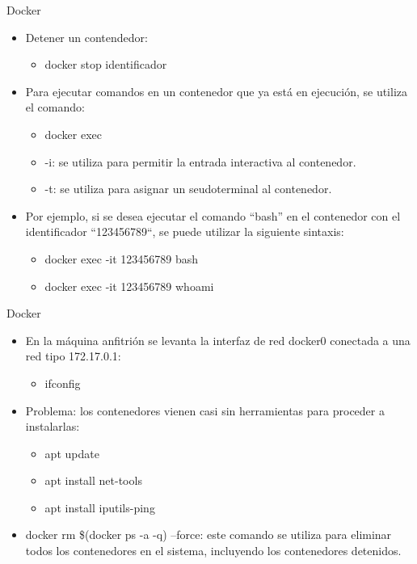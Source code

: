 \documentclass[aspectratio=169,11pt]{beamer}
\begin{document}
\begin{frame}[allowframebreaks]{Docker}
\small
  \begin{itemize}
  \item Detener un contendedor:
  \begin{itemize}
  \item docker stop identificador
  \end{itemize}
  \item Para ejecutar comandos en un contenedor que ya está en ejecución, se utiliza el comando:
  \begin{itemize}
  \item docker exec
  \item -i: se utiliza para permitir la entrada interactiva al contenedor.
  \item -t: se utiliza para asignar un seudoterminal al contenedor.
  \end{itemize}
  \item Por ejemplo, si se desea ejecutar el comando ``bash'' en el contenedor con el identificador ``123456789``, se puede utilizar la siguiente sintaxis:
  \begin{itemize}

  \item docker exec -it 123456789 bash
  \item docker exec -it 123456789 whoami
    \end{itemize}
  \end{itemize}
\end{frame}

\begin{frame}[allowframebreaks]{Docker}
\small
  \begin{itemize}
  \item En la máquina anfitrión se levanta la interfaz de red docker0 conectada a una red tipo 172.17.0.1:
    \begin{itemize}
    \item ifconfig
    \end{itemize}
  \item Problema: los contenedores vienen casi sin herramientas para proceder a instalarlas:
    \begin{itemize}
    \item apt update
    \item apt install net-tools
    \item apt install iputils-ping
    \end{itemize}
    \item docker rm \$(docker ps -a -q) --force: este comando se utiliza para eliminar todos los contenedores en el sistema, incluyendo los contenedores detenidos.
  \end{itemize}
\end{frame}
\end{document}
